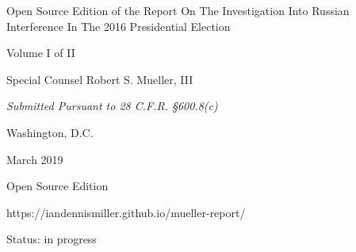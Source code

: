 \thispagestyle{empty}

\begin{center}
\Huge
Open Source Edition of the
Report On The Investigation Into Russian Interference In The 2016 Presidential Election

\vspace{10 mm}

\large
Volume I of II

\vspace{10 mm}

Special Counsel Robert S. Mueller, III

\vspace{10 mm}

\normalsize

\textit{Submitted Pursuant to 28 C.F.R. \S 600.8(c)}

\vspace{20 mm}

Washington, D.C.

\vspace{10 mm}

March 2019

\vspace{10 mm}

\large
Open Source Edition

https://iandennismiller.github.io/mueller-report/

Status: in progress

\end{center}

\newpage
